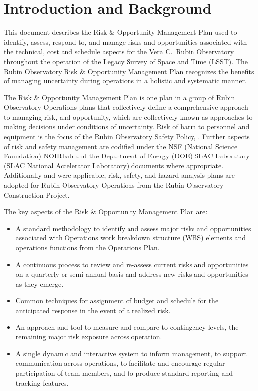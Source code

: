 \section{Introduction and Background}

This document describes the Risk \& Opportunity Management Plan used to identify, assess, respond to, and manage risks and opportunities associated with the technical, cost and schedule aspects for the Vera C.\ Rubin Observatory throughout the operation of the Legacy Survey of Space and Time (LSST).
The Rubin Observatory Risk \& Opportunity Management Plan recognizes the benefits of managing uncertainty during operations in a holistic and systematic manner.

The Risk \& Opportunity Management Plan is one plan in a group of Rubin Observatory Operations plans that collectively define a comprehensive approach to managing risk, and opportunity, which are collectively known as approaches to making decisions under conditions of uncertainty.
Risk of harm to personnel and equipment is the focus of the Rubin Observatory Safety Policy, .
Further aspects of risk and safety management are codified under the NSF (National Science Foundation) NOIRLab and the Department of Energy (DOE) SLAC Laboratory (SLAC National Accelerator Laboratory) documents where appropriate. 
Additionally and were applicable, risk, safety, and hazard analysis plans are adopted for Rubin Observatory Operations from the Rubin Observatory Construction Project.

The key aspects of the Risk \& Opportunity Management Plan are:
\begin{itemize}
	\item A standard methodology to identify and assess major risks and opportunities associated with Operations work breakdown structure (WBS) elements and operations functions from the Operations Plan.

	\item A continuous process to review and re-assess current risks and opportunities on a quarterly or semi-annual basis and address new risks and opportunities as they emerge.
	
	\item Common techniques for assignment of budget and schedule for the anticipated response in the event of a realized risk.
	
	\item An approach and tool to measure and compare to contingency levels, the remaining major risk exposure across operation.
	
	\item A single dynamic and interactive system to inform management, to support communication across operations, to facilitate and encourage regular participation of team members, and to produce standard reporting and tracking features.
\end{itemize}


